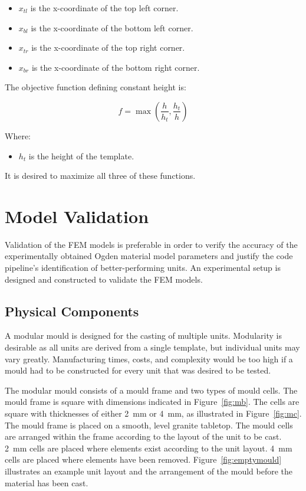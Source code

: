 \begin{itemize}
	\item $x_{tl}$ is the x-coordinate of the top left corner.
	\item $x_{bl}$ is the x-coordinate of the bottom left corner.
	\item $x_{tr}$ is the x-coordinate of the top right corner.
	\item $x_{br}$ is the x-coordinate of the bottom right corner.
\end{itemize}

The objective function defining constant height is:

\begin{equation}
	f=\max\left (\frac{h}{h_{t}},\frac{h_{t}}{h} \right )
\end{equation}

Where:

\begin{itemize}
	\item $h_{t}$ is the height of the template.
\end{itemize}

It is desired to maximize all three of these functions.

\section{Model Validation}
\label{sec:MV}

Validation of the FEM models is preferable in order to verify the accuracy of the experimentally obtained Ogden material model parameters and justify the code pipeline's identification of better-performing units. An experimental setup is designed and constructed to validate the FEM models.

\subsection{Physical Components}
\label{ssec:pc}

A modular mould is designed for the casting of multiple units. Modularity is desirable as all units are derived from a single template, but individual units may vary greatly. Manufacturing times, costs, and complexity would be too high if a mould had to be constructed for every unit that was desired to be tested.

The modular mould consists of a mould frame and two types of mould cells. The mould frame is square with dimensions indicated in Figure~\ref{fig:mb}. The cells are square with thicknesses of either \SI{2}{mm} or \SI{4}{mm}, as illustrated in Figure~\ref{fig:mc}. The mould frame is placed on a smooth, level granite tabletop. The mould cells are arranged within the frame according to the layout of the unit to be cast. \SI{2}{mm} cells are placed where elements exist according to the unit layout. \SI{4}{mm} cells are placed where elements have been removed. Figure~\ref{fig:emptymould} illustrates an example unit layout and the arrangement of the mould before the material has been cast.

